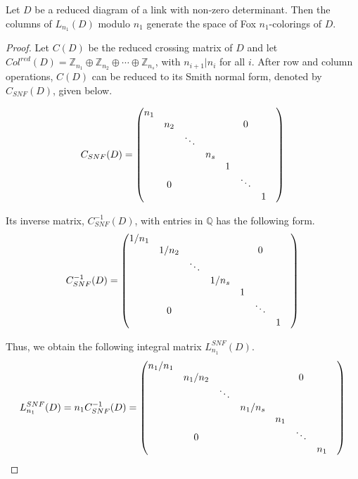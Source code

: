 \documentclass[10pt,a4paper]{amsart}
\begin{document}
\begin{theorem}\label{generatorlemma}
        Let $D$ be a reduced  diagram of a link with non-zero determinant. Then the columns of $L_{n_1}(D)$  modulo $n_1$  generate the space of Fox $n_1$-colorings of $D$.
        
\end{theorem}

\begin{proof}

 Let $C(D)$ be the reduced crossing matrix of $D$ and let $Col^{red}(D) = \mathbb Z_{n_1}\oplus \mathbb Z_{n_2}\oplus \cdots \oplus \mathbb Z_{n_s}$, with $n_{i+1} | n_i$ for all $i$. After row and column operations, $C(D)$ can be reduced to its Smith normal form, denoted by $C_{SNF}(D)$, given below.

\begin{equation*}
C_{SNF}(D) =
\begin{pmatrix}
    n_{1} & &  && \\
    &n_{2} &  &&&\text{\Huge0}& \\
    & & \ddots&&& \\
    & &&n_s && \\
     &&&&1 && \\
&\text{\Huge0}&&&&\ddots &&\\
    & & &&&& 1
  \end{pmatrix}
\end{equation*}

Its inverse matrix, $C^{-1}_{SNF}(D)$, with entries in $\mathbb{Q}$ has the following form.
\begin{equation*}
C^{-1}_{SNF}(D) =
\begin{pmatrix}
    1/n_{1} & &  && \\
    &1/n_{2} &  &&&\text{\Huge0}& \\
    & & \ddots&&& \\
    & &&1/n_s && \\
     &&&&1 && \\
&\text{\Huge0}&&&&\ddots &&\\
    & & &&&& 1
  \end{pmatrix}
\end{equation*}

Thus, we obtain the following integral matrix $L^{SNF}_{n_1}(D)$.
\begin{equation*}
L^{SNF}_{n_1}(D)=n_1 C^{-1}_{SNF}(D)=
\begin{pmatrix}
    n_1/n_{1} & &  && \\
    &n_1/n_{2} &  &&&\text{\Huge0}& \\
    & & \ddots&&& \\
    & &&n_1/n_s && \\
     &&&&n_1 && \\
&\text{\Huge0}&&&&\ddots &&\\
    & & &&&& n_1
  \end{pmatrix}
\end{equation*}


\end{proof}
\end{document}
